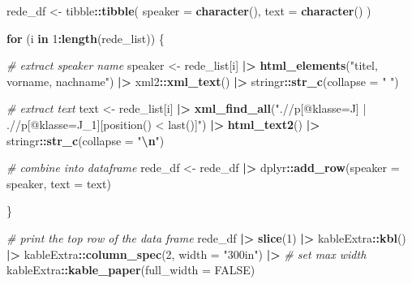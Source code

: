 \documentclass[
]{article}
\newenvironment{Shaded}{\begin{snugshade}}{\end{snugshade}}
\newcommand{\AttributeTok}[1]{\textcolor[rgb]{0.13,0.29,0.53}{#1}}
\newcommand{\CommentTok}[1]{\textcolor[rgb]{0.56,0.35,0.01}{\textit{#1}}}
\newcommand{\ConstantTok}[1]{\textcolor[rgb]{0.56,0.35,0.01}{#1}}
\newcommand{\ControlFlowTok}[1]{\textcolor[rgb]{0.13,0.29,0.53}{\textbf{#1}}}
\newcommand{\DecValTok}[1]{\textcolor[rgb]{0.00,0.00,0.81}{#1}}
\newcommand{\FunctionTok}[1]{\textcolor[rgb]{0.13,0.29,0.53}{\textbf{#1}}}
\newcommand{\NormalTok}[1]{#1}
\newcommand{\OtherTok}[1]{\textcolor[rgb]{0.56,0.35,0.01}{#1}}
\newcommand{\SpecialCharTok}[1]{\textcolor[rgb]{0.81,0.36,0.00}{\textbf{#1}}}
\newcommand{\StringTok}[1]{\textcolor[rgb]{0.31,0.60,0.02}{#1}}
\begin{document}
\begin{Shaded}
\begin{Highlighting}[]
\NormalTok{rede\_df }\OtherTok{\textless{}{-}}\NormalTok{ tibble}\SpecialCharTok{::}\FunctionTok{tibble}\NormalTok{(}
  \AttributeTok{speaker =} \FunctionTok{character}\NormalTok{(),}
  \AttributeTok{text =} \FunctionTok{character}\NormalTok{()}
\NormalTok{  )}

\ControlFlowTok{for}\NormalTok{ (i }\ControlFlowTok{in} \DecValTok{1}\SpecialCharTok{:}\FunctionTok{length}\NormalTok{(rede\_list)) \{}
  
  \CommentTok{\# extract speaker name}
\NormalTok{  speaker }\OtherTok{\textless{}{-}}\NormalTok{ rede\_list[i] }\SpecialCharTok{|\textgreater{}} 
    \FunctionTok{html\_elements}\NormalTok{(}\StringTok{"titel, vorname, nachname"}\NormalTok{) }\SpecialCharTok{|\textgreater{}} 
\NormalTok{    xml2}\SpecialCharTok{::}\FunctionTok{xml\_text}\NormalTok{() }\SpecialCharTok{|\textgreater{}} 
\NormalTok{    stringr}\SpecialCharTok{::}\FunctionTok{str\_c}\NormalTok{(}\AttributeTok{collapse =} \StringTok{" "}\NormalTok{)}
  
  \CommentTok{\# extract text}
\NormalTok{  text }\OtherTok{\textless{}{-}}\NormalTok{ rede\_list[i] }\SpecialCharTok{|\textgreater{}} 
    \FunctionTok{xml\_find\_all}\NormalTok{(}\StringTok{".//p[@klasse=\textquotesingle{}J\textquotesingle{}] | .//p[@klasse=\textquotesingle{}J\_1\textquotesingle{}][position() \textless{} last()]"}\NormalTok{) }\SpecialCharTok{|\textgreater{}}
    \FunctionTok{html\_text2}\NormalTok{() }\SpecialCharTok{|\textgreater{}} 
\NormalTok{    stringr}\SpecialCharTok{::}\FunctionTok{str\_c}\NormalTok{(}\AttributeTok{collapse =} \StringTok{"}\SpecialCharTok{\textbackslash{}n}\StringTok{"}\NormalTok{)}
  
  \CommentTok{\# combine into dataframe}
\NormalTok{  rede\_df }\OtherTok{\textless{}{-}}\NormalTok{ rede\_df }\SpecialCharTok{|\textgreater{}} 
\NormalTok{    dplyr}\SpecialCharTok{::}\FunctionTok{add\_row}\NormalTok{(}\AttributeTok{speaker =}\NormalTok{ speaker, }\AttributeTok{text =}\NormalTok{ text)}
  
\NormalTok{\}}

\CommentTok{\# print the top row of the data frame}
\NormalTok{rede\_df }\SpecialCharTok{|\textgreater{}} 
  \FunctionTok{slice}\NormalTok{(}\DecValTok{1}\NormalTok{) }\SpecialCharTok{|\textgreater{}} 
\NormalTok{  kableExtra}\SpecialCharTok{::}\FunctionTok{kbl}\NormalTok{() }\SpecialCharTok{|\textgreater{}} 
\NormalTok{  kableExtra}\SpecialCharTok{::}\FunctionTok{column\_spec}\NormalTok{(}\DecValTok{2}\NormalTok{, }\AttributeTok{width =} \StringTok{"300in"}\NormalTok{) }\SpecialCharTok{|\textgreater{}}  \CommentTok{\# set max width}
\NormalTok{  kableExtra}\SpecialCharTok{::}\FunctionTok{kable\_paper}\NormalTok{(}\AttributeTok{full\_width =} \ConstantTok{FALSE}\NormalTok{) }
\end{Highlighting}
\end{Shaded}
\end{document}
